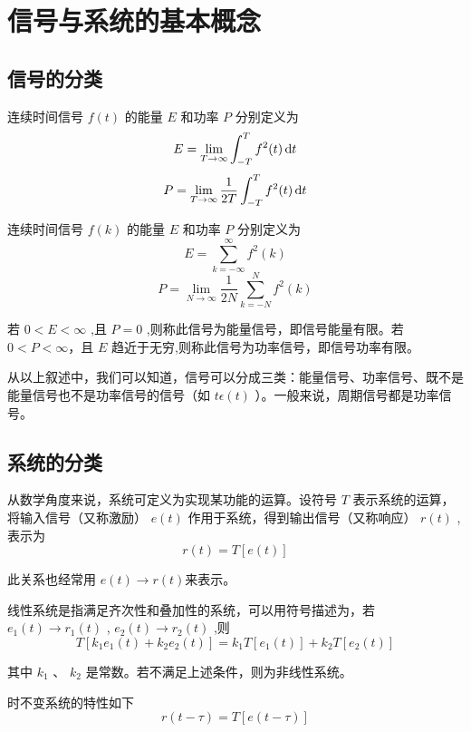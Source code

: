 \documentclass[UTF8,a4paper,11pt]{article}
\begin{document}
\section{信号与系统的基本概念}
\subsection{信号的分类}
连续时间信号 $f(t)$ 的能量 $E$ 和功率 $P$ 分别定义为
\begin{equation}
E=\lim_{T \to \infty}\int_{-T}^{T} {f^2(t)} \,{\rm d}t
\end{equation}
\begin{equation}
P=\lim_{T \to \infty}\frac{1}{2T}\int_{-T}^{T} {f^2(t)} \,{\rm d}t 
\end{equation}

连续时间信号 $f(k)$ 的能量 $E$ 和功率 $P$ 分别定义为
\begin{equation}
E=\sum_{k=-\infty}^\infty f^2(k)
\end{equation}
\begin{equation}
P=\lim_{N \to \infty}\frac{1}{2N}\sum_{k=-N}^N f^2(k)
\end{equation}

若 $0<E<\infty$ ,且 $P=0$ ,则称此信号为能量信号，即信号能量有限。若 $0<P<\infty$，且 $E$ 趋近于无穷,则称此信号为功率信号，即信号功率有限。

从以上叙述中，我们可以知道，信号可以分成三类：能量信号、功率信号、既不是能量信号也不是功率信号的信号（如 $t\epsilon(t)$ ）。一般来说，周期信号都是功率信号。

\subsection{系统的分类}
从数学角度来说，系统可定义为实现某功能的运算。设符号 $T$ 表示系统的运算，将输入信号（又称激励） $e(t)$ 作用于系统，得到输出信号（又称响应） $r(t)$ ,表示为
\begin{equation}
r(t)=T[e(t)] 
\end{equation}

此关系也经常用 $e(t)\to r(t)$来表示。

线性系统是指满足齐次性和叠加性的系统，可以用符号描述为，若 $e_1(t)\to r_1(t)$ , $e_2(t)\to r_2(t)$ ,则
\begin{equation}
T[k_1e_1(t)+k_2e_2(t)]=k_1T[e_1(t)]+k_2T[e_2(t)] 
\end{equation}

其中 $k_1$ 、 $k_2$ 是常数。若不满足上述条件，则为非线性系统。

时不变系统的特性如下
\begin{equation}
r(t-\tau)=T[e(t-\tau)]
\end{equation}
\end{document}

